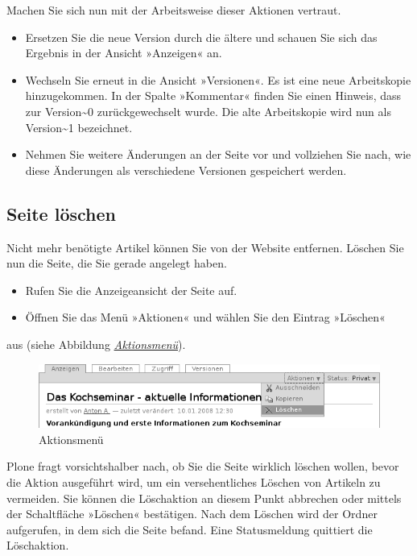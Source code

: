 \documentclass[a4paper,12pt,ngerman]{manual}
\begin{document}
Machen Sie sich nun mit der Arbeitsweise dieser Aktionen vertraut.
\begin{itemize}
\item {} 
Ersetzen Sie die neue Version durch die ältere und schauen Sie sich
das Ergebnis in der Ansicht »Anzeigen« an.

\item {} 
Wechseln Sie erneut in die Ansicht »Versionen«. Es ist eine neue
Arbeitskopie hinzugekommen. In der Spalte »Kommentar« finden Sie einen
Hinweis, dass zur Version\textasciitilde{}0 zurückgewechselt wurde.
Die alte Arbeitskopie wird nun als Version\textasciitilde{}1 bezeichnet.

\item {} 
Nehmen Sie weitere Änderungen an der Seite vor und vollziehen Sie nach,
wie diese Änderungen als verschiedene Versionen gespeichert werden.

\end{itemize}


\subsection{Seite löschen}

Nicht mehr benötigte Artikel können Sie von der Website entfernen. Löschen Sie
nun die Seite, die Sie gerade angelegt haben.
\begin{itemize}
\item {} 
Rufen Sie die Anzeigeansicht der Seite auf.

\item {} 
Öffnen Sie das Menü »Aktionen« und wählen Sie den Eintrag »Löschen«

\end{itemize}

aus (siehe Abbildung \hyperlink{fig-aktionen-loeschen}{\emph{Aktionsmenü}}).
\hypertarget{fig-aktionen-loeschen}{}\begin{figure}[htbp]
\centering

\includegraphics{aktionen-loeschen.png}
\caption{Aktionsmenü}\end{figure}

Plone fragt vorsichtshalber nach, ob Sie die Seite wirklich löschen wollen,
bevor die Aktion ausgeführt wird, um ein versehentliches Löschen von Artikeln
zu vermeiden. Sie können die Löschaktion an diesem Punkt abbrechen oder
mittels der Schaltfläche »Löschen« bestätigen. Nach dem Löschen wird der
Ordner aufgerufen, in dem sich die Seite befand. Eine Statusmeldung quittiert
die Löschaktion.
\end{document}
